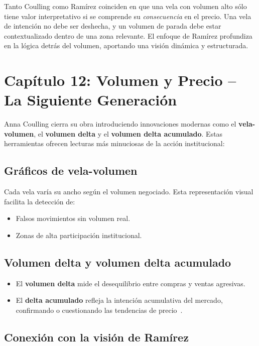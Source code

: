 Tanto Coulling como Ram\'irez coinciden en que una vela con volumen alto s\'olo tiene valor interpretativo si se comprende su \textit{consecuencia} en el precio. Una vela de intenci\'on no debe ser deshecha, y un volumen de parada debe estar contextualizado dentro de una zona relevante. El enfoque de Ram\'irez profundiza en la l\'ogica detr\'as del volumen, aportando una visi\'on din\'amica y estructurada.

\vspace{1em}
\section*{Cap\'itulo 12: Volumen y Precio – La Siguiente Generaci\'on}

Anna Coulling cierra su obra introduciendo innovaciones modernas como el \textbf{vela-volumen}, el \textbf{volumen delta} y el \textbf{volumen delta acumulado}. Estas herramientas ofrecen lecturas m\'as minuciosas de la acci\'on institucional:

\subsection*{Gr\'aficos de vela-volumen}

Cada vela var\'ia su ancho seg\'un el volumen negociado. Esta representaci\'on visual facilita la detecci\'on de:
\begin{itemize}
  \item Falsos movimientos sin volumen real.
  \item Zonas de alta participaci\'on institucional.
\end{itemize}

\subsection*{Volumen delta y volumen delta acumulado}

\begin{itemize}
  \item El \textbf{volumen delta} mide el desequilibrio entre compras y ventas agresivas.
  \item El \textbf{delta acumulado} refleja la intenci\'on acumulativa del mercado, confirmando o cuestionando las tendencias de precio~\cite{Coulling13}.
\end{itemize}

\subsection*{Conexi\'on con la visi\'on de Ram\'irez}

